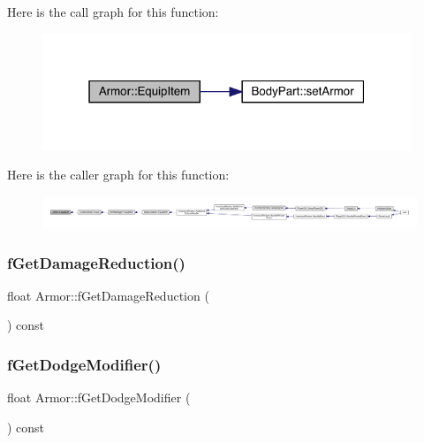 Here is the call graph for this function\+:
\nopagebreak
\begin{figure}[H]
\begin{center}
\leavevmode
\includegraphics[width=313pt]{d9/d76/class_armor_a697e23862a5a6bb32fc5b1b143d61f58_cgraph}
\end{center}
\end{figure}
Here is the caller graph for this function\+:
\nopagebreak
\begin{figure}[H]
\begin{center}
\leavevmode
\includegraphics[width=350pt]{d9/d76/class_armor_a697e23862a5a6bb32fc5b1b143d61f58_icgraph}
\end{center}
\end{figure}
\mbox{\label{class_armor_a2ac47305b38298494fae82c69c935fba}} 
\subsubsection{\texorpdfstring{f\+Get\+Damage\+Reduction()}{fGetDamageReduction()}}
{\footnotesize\ttfamily float Armor\+::f\+Get\+Damage\+Reduction (\begin{DoxyParamCaption}{ }\end{DoxyParamCaption}) const}

\mbox{\label{class_armor_a2eab88550e74345eef13e2a279a2f995}} 
\subsubsection{\texorpdfstring{f\+Get\+Dodge\+Modifier()}{fGetDodgeModifier()}}
{\footnotesize\ttfamily float Armor\+::f\+Get\+Dodge\+Modifier (\begin{DoxyParamCaption}{ }\end{DoxyParamCaption}) const}

